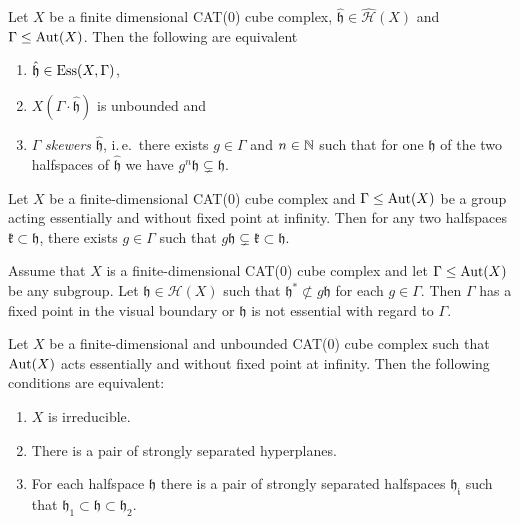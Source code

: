 \begin{lemma}
  \label{lem:ess-unbounded}
  Let \(X\) be a finite dimensional CAT(0) cube complex, \(\mathfrak{\hat h} \in \mathcal{\hat H}(X)\) and \(\Gamma \leq \operatorname{Aut}(X)\). Then the following are equivalent
  \begin{enumerate}
  \item \(\mathfrak{\hat h} \in \operatorname{Ess}(X,\Gamma)\),
  \item  \(X(\Gamma \cdot \mathfrak{\hat h})\) is unbounded and
  \item \(\Gamma\) \emph{skewers} \(\mathfrak{\hat h}\), i.\,e.\ there exists \(g \in \Gamma\) and \(n \in \mathbb{N}\) such that for one \(\mathfrak{h}\) of the two halfspaces of \(\mathfrak{\hat h}\) we have \(g^n \mathfrak{h} \subsetneq \mathfrak{h}\).
  \end{enumerate}
\end{lemma}

\begin{lemma}
  \label{lem:cs-dsl}
  Let \(X\) be a finite-dimensional CAT(0) cube complex and \(\Gamma \leq \operatorname{Aut}(X)\) be a group acting essentially and without fixed point at infinity. Then for any two halfspaces \(\mathfrak{k} \subset \mathfrak{h}\), there exists \(g \in \Gamma\) such that \(g \mathfrak{h} \subsetneq \mathfrak{k} \subset \mathfrak{h}\).
\end{lemma}

\begin{thm}
  \label{thm:cs-flipping}
  Assume that \(X\) is a finite-dimensional CAT(0) cube complex and let \(\Gamma \leq \operatorname{Aut}(X)\) be any subgroup. Let \(\mathfrak{h} \in \mathcal{H}(X)\) such that \(\mathfrak{h}^\ast \not\subset g\mathfrak{h}\) for each \(g \in \Gamma\). Then \(\Gamma\) has a fixed point in the visual boundary or \(\mathfrak{h}\) is not essential with regard to \(\Gamma\).
\end{thm}

\begin{prop}
  \label{prop:cs-5.1}
  Let \(X\) be a finite-dimensional and unbounded CAT(0) cube complex such that \(\operatorname{Aut}(X)\) acts essentially and without fixed point at infinity. Then the following conditions are equivalent:
  \begin{enumerate}
  \item \(X\) is irreducible.
  \item There is a pair of strongly separated hyperplanes.
  \item For each halfspace \(\mathfrak{h}\) there is a pair of strongly separated halfspaces \(\mathfrak{h_i}\) such that \(\mathfrak{h}_1 \subset \mathfrak{h} \subset \mathfrak{h}_2\).
  \end{enumerate}
\end{prop}

